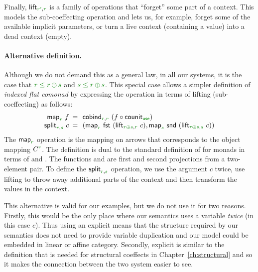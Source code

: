 Finally, $\ident{lift}_{\cclrd{r'}, \cclrd{r}}$ is a family of operations that ``forget'' some part of
a context. This models the sub-coeffecting operation and lets us, for example, forget some of the
available implicit parameters, or turn a live context (containing a value) into a dead context (empty).

\paragraph{Alternative definition.}
Although we do not demand this as a general law, in all our systems, it is the case that
$\cclrd{r} \;\cleq\; \cclrd{r}\,\cpar\,\cclrd{s}$ and $\cclrd{s} \;\cleq\; \cclrd{r}\,\cpar\,\cclrd{s}$.
This special case allows a simpler definition of \emph{indexed flat comonad} by expressing the 
 operation in terms of lifting (sub-coeffecting) as follows:
%
\begin{equation*}
\begin{array}{rcl}
\ident{map}_{\cclrd{r}}~f &\narrow{=}& \ident{cobind}_{\cclrd{r}, \cclrd{r}}~(f\circ\ident{counit}_{\cunit}) \\
\ident{split}_{\cclrd{r}, \cclrd{s}}~c &\narrow{=}&
  ( \ident{map}_{\cclrd{r}}~\ident{fst}~(\ident{lift}_{\cclrd{r}\cpar\cclrd{s}, \cclrd{r}}~c), 
    \ident{map}_{\cclrd{s}}~\ident{snd}~(\ident{lift}_{\cclrd{r}\cpar\cclrd{s}, \cclrd{s}}~c) )
\end{array}
\end{equation*}
%
The $\ident{map}_{\cclrd{r}}$ operation is the mapping on arrows that corresponds to the object 
mapping $\ctyp{\cclrd{r}}{}$. The definition is dual to the standard definition of  
for monads in terms of  and . The functions  and 
are first and second projections from a two-element pair. To define the 
$\ident{split}_{\cclrd{r}, \cclrd{s}}$ operation, we use the argument $c$ twice, use lifting
to throw away additional parts of the context and then transform the values in the 
context.

This alternative is valid for our examples, but we do not use it for two reasons. Firstly, this
would be the only place where our semantics uses a variable \emph{twice} (in this case $c$). 
Thus using an explicit  means that the structure required by our semantics does not
need to provide variable duplication and our model could be embedded in linear or affine category.
Secondly, explicit  is similar to the definition that is needed for structural 
coeffects in Chapter~\ref{ch:structural} and so it makes the connection between the two system 
easier to see.


